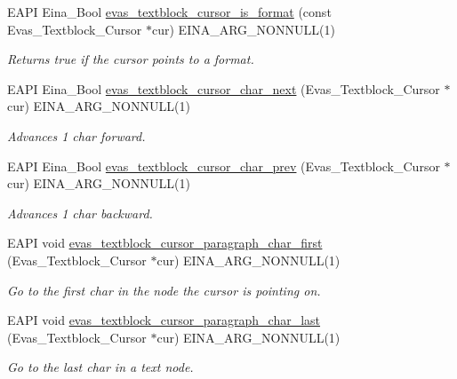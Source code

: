 \begin{DoxyCompactItemize}
EAPI Eina\_\-Bool \hyperlink{group__Evas__Object__Textblock_gaf389372f80b4cd3f2fc1fd8b99637367}{evas\_\-textblock\_\-cursor\_\-is\_\-format} (const Evas\_\-Textblock\_\-Cursor $\ast$cur) EINA\_\-ARG\_\-NONNULL(1)
\begin{DoxyCompactList}\small\item\em Returns true if the cursor points to a format. \item\end{DoxyCompactList}\item 
EAPI Eina\_\-Bool \hyperlink{group__Evas__Object__Textblock_ga8f3fba0d1d853db5694b3803db73d9cd}{evas\_\-textblock\_\-cursor\_\-char\_\-next} (Evas\_\-Textblock\_\-Cursor $\ast$cur) EINA\_\-ARG\_\-NONNULL(1)
\begin{DoxyCompactList}\small\item\em Advances 1 char forward. \item\end{DoxyCompactList}\item 
EAPI Eina\_\-Bool \hyperlink{group__Evas__Object__Textblock_gace122729e6764dc54bfee83b9865efc9}{evas\_\-textblock\_\-cursor\_\-char\_\-prev} (Evas\_\-Textblock\_\-Cursor $\ast$cur) EINA\_\-ARG\_\-NONNULL(1)
\begin{DoxyCompactList}\small\item\em Advances 1 char backward. \item\end{DoxyCompactList}\item 
EAPI void \hyperlink{group__Evas__Object__Textblock_ga14a0a29c79eeb378c73f1383bb09424d}{evas\_\-textblock\_\-cursor\_\-paragraph\_\-char\_\-first} (Evas\_\-Textblock\_\-Cursor $\ast$cur) EINA\_\-ARG\_\-NONNULL(1)
\begin{DoxyCompactList}\small\item\em Go to the first char in the node the cursor is pointing on. \item\end{DoxyCompactList}\item 
EAPI void \hyperlink{group__Evas__Object__Textblock_gaf504e62cf0b498631ec8154c14b2efb4}{evas\_\-textblock\_\-cursor\_\-paragraph\_\-char\_\-last} (Evas\_\-Textblock\_\-Cursor $\ast$cur) EINA\_\-ARG\_\-NONNULL(1)
\begin{DoxyCompactList}\small\item\em Go to the last char in a text node. \item\end{DoxyCompactList}\item 

\end{DoxyCompactItemize}
